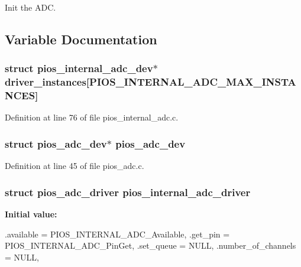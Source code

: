 \-Init the \-A\-D\-C. 



\subsection{\-Variable \-Documentation}
\hypertarget{group___p_i_o_s___a_d_c_ga5250ef3bb34ef47503a057a9b95c494a}{
\subsubsection[{driver\-\_\-instances}]{\setlength{\rightskip}{0pt plus 5cm}struct {\bf pios\-\_\-internal\-\_\-adc\-\_\-dev}$\ast$ {\bf driver\-\_\-instances}\mbox{[}\-P\-I\-O\-S\-\_\-\-I\-N\-T\-E\-R\-N\-A\-L\-\_\-\-A\-D\-C\-\_\-\-M\-A\-X\-\_\-\-I\-N\-S\-T\-A\-N\-C\-E\-S\mbox{]}}}\label{group___p_i_o_s___a_d_c_ga5250ef3bb34ef47503a057a9b95c494a}


\-Definition at line 76 of file pios\-\_\-internal\-\_\-adc.\-c.

\hypertarget{group___p_i_o_s___a_d_c_gab32db3584e1b8779726fcabc7aa2dc9a}{
\subsubsection[{pios\-\_\-adc\-\_\-dev}]{\setlength{\rightskip}{0pt plus 5cm}struct {\bf pios\-\_\-adc\-\_\-dev}$\ast$ {\bf pios\-\_\-adc\-\_\-dev}}}\label{group___p_i_o_s___a_d_c_gab32db3584e1b8779726fcabc7aa2dc9a}


\-Definition at line 45 of file pios\-\_\-adc.\-c.

\hypertarget{group___p_i_o_s___a_d_c_gaa1decc30319efc11cab3d3e9ba32ff8e}{
\subsubsection[{pios\-\_\-internal\-\_\-adc\-\_\-driver}]{\setlength{\rightskip}{0pt plus 5cm}struct {\bf pios\-\_\-adc\-\_\-driver} {\bf pios\-\_\-internal\-\_\-adc\-\_\-driver}}}\label{group___p_i_o_s___a_d_c_gaa1decc30319efc11cab3d3e9ba32ff8e}
{\bfseries \-Initial value\-:}
\begin{DoxyCode}
 {
                .available      = PIOS_INTERNAL_ADC_Available,
                .get_pin        = PIOS_INTERNAL_ADC_PinGet,
                .set_queue      = NULL,
                .number_of_channels = NULL,
}
\end{DoxyCode}


